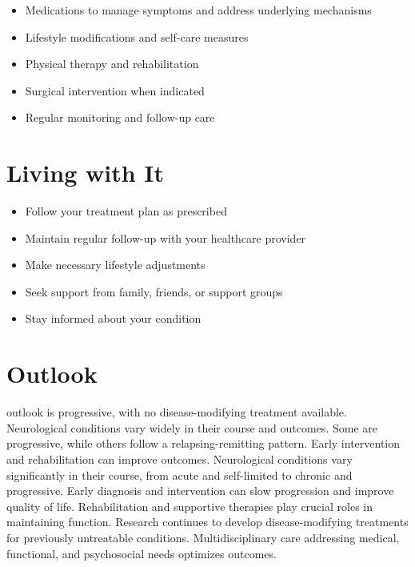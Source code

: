 \begin{itemize}[noitemsep]
  \item Medications to manage symptoms and address underlying mechanisms
  \item Lifestyle modifications and self-care measures
  \item Physical therapy and rehabilitation
  \item Surgical intervention when indicated
  \item Regular monitoring and follow-up care
\end{itemize}
\section{Living with It}
\begin{itemize}[noitemsep]
  \item Follow your treatment plan as prescribed
  \item Maintain regular follow-up with your healthcare provider
  \item Make necessary lifestyle adjustments
  \item Seek support from family, friends, or support groups
  \item Stay informed about your condition
\end{itemize}
\section{Outlook}
outlook is progressive, with no disease-modifying treatment available. Neurological conditions vary widely in their course and outcomes. Some are progressive, while others follow a relapsing-remitting pattern. Early intervention and rehabilitation can improve outcomes. Neurological conditions vary significantly in their course, from acute and self-limited to chronic and progressive. Early diagnosis and intervention can slow progression and improve quality of life. Rehabilitation and supportive therapies play crucial roles in maintaining function. Research continues to develop disease-modifying treatments for previously untreatable conditions. Multidisciplinary care addressing medical, functional, and psychosocial needs optimizes outcomes.
